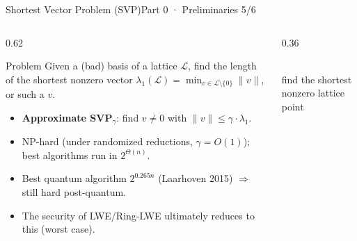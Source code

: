 \documentclass[aspectratio=169, 11pt]{beamer}
\begin{document}
\begin{frame}{Shortest Vector Problem (SVP)}{Part 0 · Preliminaries 5/6}
  \begin{columns}[T]
    \begin{column}{0.62\textwidth}
      \begin{block}{Problem}
        Given a (bad) basis of a lattice $\mathcal{L}$, find the length of the shortest nonzero vector
        $\lambda_1(\mathcal{L})=\min_{v\in\mathcal{L}\setminus\{0\}}\|v\|$, or such a $v$.
      \end{block}
      \begin{itemize}\small
        \item \textbf{Approximate SVP$_\gamma$}: find $v\neq0$ with $\|v\|\le\gamma\cdot\lambda_1$.
        \item NP-hard (under randomized reductions, $\gamma=O(1)$); best algorithms run in $2^{\Theta(n)}$.
        \item Best quantum algorithm $2^{0.265n}$ (Laarhoven 2015) $\Rightarrow$ still hard post-quantum.
        \item The security of LWE/Ring-LWE ultimately reduces to this (worst case).
      \end{itemize}
    \end{column}
    \begin{column}{0.36\textwidth}
      \centering
      \\[2pt]{\scriptsize find the shortest nonzero lattice point}
    \end{column}
  \end{columns}
\end{frame}
\end{document}
